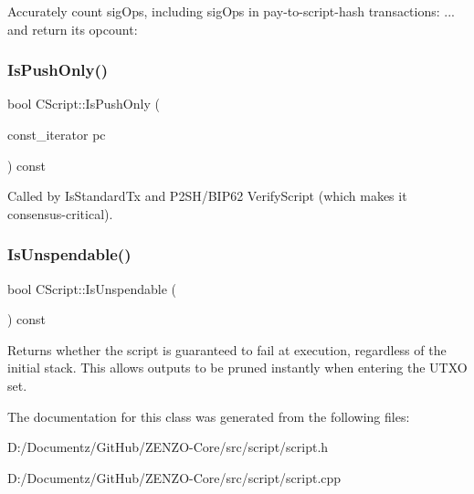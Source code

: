 Accurately count sig\+Ops, including sig\+Ops in pay-\/to-\/script-\/hash transactions\+: ... and return its opcount\+: \mbox{\label{class_c_script_a090905f875fa5a40e616b319de8e973f}} 
\subsubsection{\texorpdfstring{IsPushOnly()}{IsPushOnly()}}
{\footnotesize\ttfamily bool C\+Script\+::\+Is\+Push\+Only (\begin{DoxyParamCaption}\item[{const\+\_\+iterator}]{pc }\end{DoxyParamCaption}) const}

Called by Is\+Standard\+Tx and P2\+S\+H/\+B\+I\+P62 Verify\+Script (which makes it consensus-\/critical). \mbox{\label{class_c_script_a11c26ad1d03fa2d60a733337c21b6719}} 
\subsubsection{\texorpdfstring{IsUnspendable()}{IsUnspendable()}}
{\footnotesize\ttfamily bool C\+Script\+::\+Is\+Unspendable (\begin{DoxyParamCaption}{ }\end{DoxyParamCaption}) const\hspace{0.3cm}{\ttfamily [inline]}}

Returns whether the script is guaranteed to fail at execution, regardless of the initial stack. This allows outputs to be pruned instantly when entering the U\+T\+XO set. 

The documentation for this class was generated from the following files\+:\begin{DoxyCompactItemize}
\item 
D\+:/\+Documentz/\+Git\+Hub/\+Z\+E\+N\+Z\+O-\/\+Core/src/script/script.\+h\item 
D\+:/\+Documentz/\+Git\+Hub/\+Z\+E\+N\+Z\+O-\/\+Core/src/script/script.\+cpp\end{DoxyCompactItemize}
